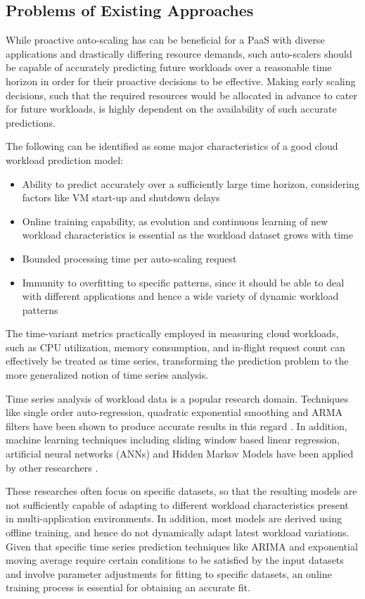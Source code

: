 \subsection{Problems of Existing Approaches}

While proactive auto-scaling has can be beneficial for a PaaS with diverse applications and drastically differing resource demands, such auto-scalers should be capable of accurately predicting future workloads over a reasonable time horizon in order for their proactive decisions to be effective.
Making early scaling decisions, such that the required resources would be allocated in advance to cater for future workloads, is highly dependent on the availability of such accurate predictions.

The following can be identified as some major characteristics of a good cloud workload prediction model:

\begin{itemize}
\item Ability to predict accurately over a sufficiently large time horizon, considering factors like VM start-up and shutdown delays
\item Online training capability, as evolution and continuous learning of new workload characteristics is essential as the workload dataset grows with time
\item Bounded processing time per auto-scaling request
\item Immunity to overfitting to specific patterns, since it should be able to deal with different applications and hence a wide variety of dynamic workload patterns
\end{itemize}

The time-variant metrics practically employed in measuring cloud workloads, such as CPU utilization, memory consumption, and in-flight request count can effectively be treated as time series, transforming the prediction problem to the more generalized notion of time series analysis.

Time series analysis of workload data is a popular research domain. Techniques like single order auto-regression, quadratic exponential smoothing and ARMA filters have been shown to produce accurate results in this regard \cite{Kupferman_2009} \cite{Mi_2010} \cite{Roy_2011}. In addition, machine learning techniques including sliding window based linear regression, artificial neural networks (ANNs) and Hidden Markov Models have been applied by other researchers \cite{Yang_2013} \cite{Khan_2012}.

These researches often focus on specific datasets, so that the resulting models are not sufficiently capable of adapting to different workload characteristics present in multi-application environments. In addition, most models are derived using offline training, and hence do not dynamically adapt latest workload variations. Given that specific time series prediction techniques like ARIMA and exponential moving average require certain conditions to be satisfied by the input datasets and involve parameter adjustments for fitting to specific datasets, an online training process is essential for obtaining an accurate fit.